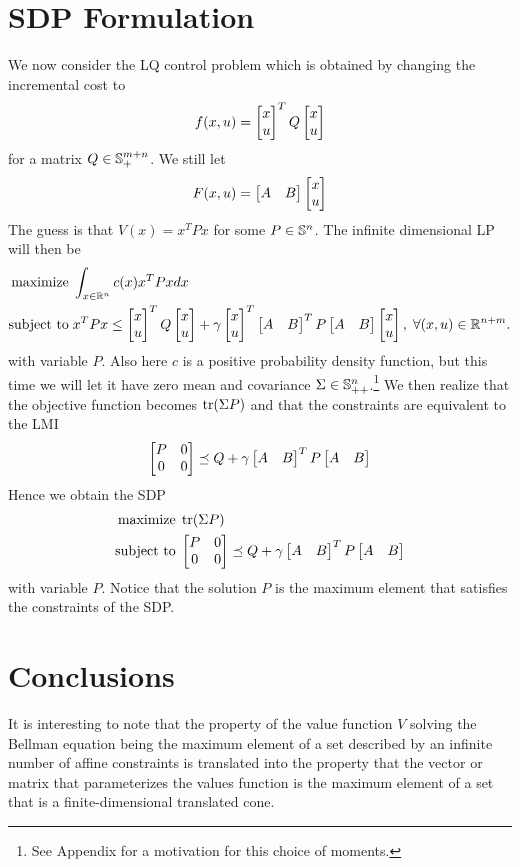 \documentclass{article}
\begin{document}
\section{SDP Formulation}
%
We now consider the LQ control problem which is obtained by changing the 
incremental cost to 
%
$$f(x,u)=\begin{bmatrix} x\\u\end{bmatrix}^TQ\begin{bmatrix} x\\u\end{bmatrix}$$
%
for a matrix $Q\in\mathbb{S}_+^{m+n}$. We still let 
%
$$F(x,u)=\begin{bmatrix} A&B\end{bmatrix}\begin{bmatrix} x\\u\end{bmatrix}$$ 
%
The guess is that $V(x)=x^TPx$ for some $P\in\mathbb{S}^n$. The infinite dimensional
LP will then be
%
\begin{align*}
\mbox{maximize}\;&\int_{x\in \mathbb{R}^n}c(x)x^TPxdx\\
\mbox{subject to} \;&x^TPx\leq \begin{bmatrix} x\\u\end{bmatrix}^TQ\begin{bmatrix} x\\u\end{bmatrix}+\gamma 
\begin{bmatrix} x\\u\end{bmatrix}^T\begin{bmatrix} A&B\end{bmatrix}^TP\begin{bmatrix} A&B\end{bmatrix}\begin{bmatrix} x\\u\end{bmatrix},\;\forall (x,u)\in\mathbb{R}^{n+m}.
\end{align*}
%
with variable $P$. Also here $c$ is a positive probability density function, but
this time we will let it have zero mean and covariance $\Sigma\in\mathbb{S}_{++}^n$.\footnote{See Appendix for a motivation for this choice of moments.}
We then realize that the objective function becomes $\operatorname{tr}(\Sigma P)$ and that the
constraints are equivalent to the LMI
%
$$\begin{bmatrix} P&0\\0&0\end{bmatrix}\preceq Q+\gamma \begin{bmatrix} A&B\end{bmatrix}^TP\begin{bmatrix} A&B\end{bmatrix}$$
%
Hence we obtain the SDP
%
\begin{align*}
\mbox{maximize}\;&\operatorname{tr}(\Sigma P)\\
\mbox{subject to} \;&\begin{bmatrix} P&0\\0&0\end{bmatrix}\preceq Q+\gamma \begin{bmatrix} A&B\end{bmatrix}^TP\begin{bmatrix} A&B\end{bmatrix}
\end{align*}
%
with variable $P$. Notice that the solution $P$ is the maximum element that satisfies
the constraints of the SDP. 
%
\section{Conclusions}
%
It is interesting to note that the property of the value function 
$V$ solving the Bellman equation being the maximum element of a set 
described by an infinite number of affine constraints is translated into the property
that the vector or matrix that parameterizes the values function is the
maximum element of a set that is a finite-dimensional translated cone. 
%
\end{document}
